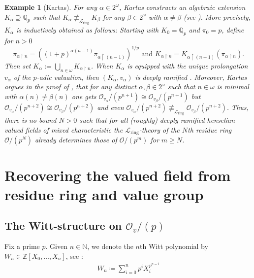 \documentclass[a4paper]{amsart}
\theoremstyle{mystyle2}
\theoremstyle{mystyle}
\newtheorem{examp}[thm]{Example}
\newcommand{\Z}{\mathbb{Z}}
\newcommand{\N}{\mathbb{N}}
\renewcommand{\L}{\mathcal{L}}
\newcommand{\Lring}{\L_{\mathrm{ring}}}
\renewcommand{\O}{\mathcal{O}}
\numberwithin{equation}{section}
\begin{document}
    \begin{examp}[Kartas]\label{ex:kartas}
        For any $\alpha \in 2^\omega$, Kartas constructs an algebraic extension 
        $K_\alpha \supseteq \mathbb{Q}_p$ such that $K_\alpha\not\equiv_{\Lring} K_\beta$ for any $\beta \in 2^\omega$ with $\alpha \neq \beta$ 
        (see \cite[Claim 2 in the proof of Proposition 3.6.9(b)]{Kar24}). 
        More precisely, $K_\alpha$ is inductively obtained as follows:
        Starting with $K_0=\mathbb{Q}_p$ and $\pi_0=p$, define for $n>0$
        $$\pi_{\alpha\restriction n}=((1+p)^{\alpha(n-1)} \pi_{\alpha\restriction (n-1)})^{1/p} \textrm{ and } K_{\alpha \restriction n}=K_{\alpha \restriction {(n-1)}}( \pi_{\alpha\restriction n}).$$ 
        Then set $K_\alpha:=\bigcup_{n \in \omega} K_{\alpha\restriction n}$.
        When $K_\alpha$ is equipped with the
        unique prolongation $v_\alpha$ of the $p$-adic valuation, then $(K_\alpha,v_\alpha)$ is
        deeply ramified \cite[Claim 3 in the proof of Proposition 3.6.9(b)]{Kar24}.
        Moreover, Kartas argues in the proof of \cite[Proposition 7.1.1]{Kar24}, that for
        any distinct
        $\alpha, \beta \in 2^\omega$ 
        such that $n\in \omega$ is minimal with $\alpha(n)\neq \beta(n)$
        one gets $\O_{v_\alpha}/(p^{n+1}) \cong \O_{v_\beta}/(p^{n+1})$
        but $\O_{v_\alpha}/(p^{n+2}) \not \cong \O_{v_\beta}/(p^{n+2})$ and even
        $\O_{v_\alpha}/(p^{n+2}) \not \equiv_{\Lring} \O_{v_\beta}/(p^{n+2})$. 
        Thus, there is no bound $N >0$ such that for all (roughly) deeply ramified
        henselian valued fields of mixed characteristic the $\Lring$-theory of the 
        $N$th residue ring $\O/(p^N)$
        already determines those of $\O/(p^m)$ for $m \geq N$.
    \end{examp}
    
    \section{Recovering the valued field from residue ring and value group}

    \subsection{The Witt-structure on \(\O_v/(p)\)}
    \label{sec:structure}
    Fix a prime \(p\).
    Given \(n\in \N\), we denote the \(n\)th Witt polynomial by \(W_n\in \Z[X_0,\ldots,X_n]\), see \cite[Section~6.2]{vdd}:
    \begin{align*}
    	W_n\coloneqq \sum_{i=0}^n p^iX_i^{p^{n-i}}
    \end{align*}
    
\end{document}
